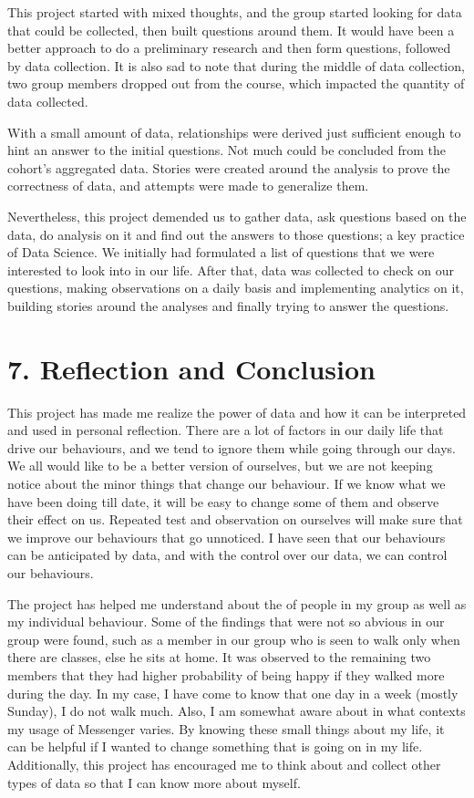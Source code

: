 \documentclass[
]{article}
\begin{document}
This project started with mixed thoughts, and the group started looking
for data that could be collected, then built questions around them. It
would have been a better approach to do a preliminary research and then
form questions, followed by data collection. It is also sad to note that
during the middle of data collection, two group members dropped out from
the course, which impacted the quantity of data collected.

With a small amount of data, relationships were derived just sufficient
enough to hint an answer to the initial questions. Not much could be
concluded from the cohort's aggregated data. Stories were created around
the analysis to prove the correctness of data, and attempts were made to
generalize them.

Nevertheless, this project demended us to gather data, ask questions
based on the data, do analysis on it and find out the answers to those
questions; a key practice of Data Science. We initially had formulated a
list of questions that we were interested to look into in our life.
After that, data was collected to check on our questions, making
observations on a daily basis and implementing analytics on it, building
stories around the analyses and finally trying to answer the questions.

\hypertarget{reflection-and-conclusion}{%
\section{7. Reflection and Conclusion}\label{reflection-and-conclusion}}

This project has made me realize the power of data and how it can be
interpreted and used in personal reflection. There are a lot of factors
in our daily life that drive our behaviours, and we tend to ignore them
while going through our days. We all would like to be a better version
of ourselves, but we are not keeping notice about the minor things that
change our behaviour. If we know what we have been doing till date, it
will be easy to change some of them and observe their effect on us.
Repeated test and observation on ourselves will make sure that we
improve our behaviours that go unnoticed. I have seen that our
behaviours can be anticipated by data, and with the control over our
data, we can control our behaviours.

The project has helped me understand about the of people in my group as
well as my individual behaviour. Some of the findings that were not so
abvious in our group were found, such as a member in our group who is
seen to walk only when there are classes, else he sits at home. It was
observed to the remaining two members that they had higher probability
of being happy if they walked more during the day. In my case, I have
come to know that one day in a week (mostly Sunday), I do not walk much.
Also, I am somewhat aware about in what contexts my usage of Messenger
varies. By knowing these small things about my life, it can be helpful
if I wanted to change something that is going on in my life.
Additionally, this project has encouraged me to think about and collect
other types of data so that I can know more about myself.
\end{document}
